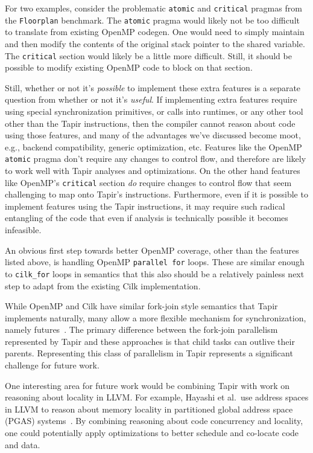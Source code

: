 \documentclass[sigconf]{acmart}
\begin{document}
For two examples, consider the problematic \texttt{atomic} and
\texttt{critical} pragmas from the \texttt{Floorplan} benchmark. The 
\texttt{atomic} pragma would likely not be too difficult to translate
from existing OpenMP codegen. One would need to simply maintain and then
modify the contents of the original stack pointer to the shared variable. The
\texttt{critical} section would likely be a little more difficult. Still, it
should be possible to modify existing OpenMP code to block on that section. 

Still, whether or not it's \emph{possible} to implement these extra features
is a separate question from whether or not it's \emph{useful}. If implementing
extra features require using special synchronization primitives, or calls into
runtimes, or any other tool other than the Tapir instructions, then the
compiler cannot reason about code using those features, and many of the
advantages we've discussed become moot, e.g., backend compatibility, generic 
optimization, etc. Features like the OpenMP \texttt{atomic} pragma don't 
require any changes to control flow, and therefore are likely to work well 
with Tapir analyses and optimizations. On the other hand features like OpenMP's
\texttt{critical} section \emph{do} require changes to control flow that seem
challenging to map onto Tapir's instructions. Furthermore, even if it
is possible to implement features using the Tapir instructions, it may require 
such radical entangling of the code that even if analysis is technically
possible it becomes infeasible. 

An obvious first step towards better OpenMP coverage, other than the features
listed above, is handling OpenMP \texttt{parallel for} loops. These are similar enough
to \texttt{cilk\_for} loops in semantics that this also should be a relatively
painless next step to adapt from the existing Cilk implementation. 

While OpenMP and Cilk have similar fork-join style semantics that Tapir
implements naturally, many allow a more flexible mechanism for synchronization, namely
futures~\cite{qthreads, chapel, hpx}. The primary difference between the
fork-join parallelism represented by Tapir and these approaches is that
child tasks can outlive their parents. Representing this class
of parallelism in Tapir represents a significant challenge for future work.

One interesting area for future work would be combining Tapir with work on
reasoning about locality in LLVM. For example, Hayashi et al.\ 
use address spaces in LLVM to reason about memory
locality in partitioned global address space (PGAS) systems~\cite{hayashi2015llvm}. By combining
reasoning about code concurrency and locality, one could potentially apply
optimizations to better schedule and co-locate code and data.
\end{document}
